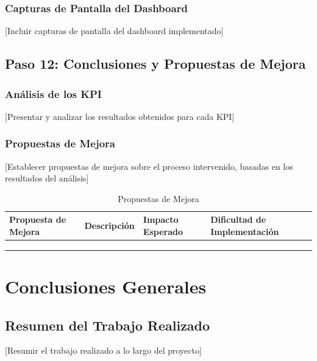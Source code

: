 \documentclass[12pt,letterpaper]{report}
\begin{document}
\subsection{Capturas de Pantalla del Dashboard}
[Incluir capturas de pantalla del dashboard implementado]

\section{Paso 12: Conclusiones y Propuestas de Mejora}

\subsection{Análisis de los KPI}
[Presentar y analizar los resultados obtenidos para cada KPI]

\subsection{Propuestas de Mejora}
[Establecer propuestas de mejora sobre el proceso intervenido, basadas en los resultados del análisis]

\begin{table}[H]
    \centering
    \begin{tabularx}{\textwidth}{|X|X|X|X|}
        \hline
        \textbf{Propuesta de Mejora} & \textbf{Descripción} & \textbf{Impacto Esperado} & \textbf{Dificultad de Implementación} \\
        \hline
        & & & \\
        \hline
        & & & \\
        \hline
        & & & \\
        \hline
    \end{tabularx}
    \caption{Propuestas de Mejora}
\end{table}

\chapter{Conclusiones Generales}

\section{Resumen del Trabajo Realizado}
[Resumir el trabajo realizado a lo largo del proyecto]
\end{document}
